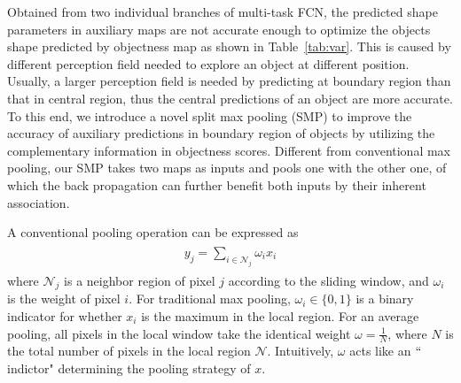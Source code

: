 Obtained from two individual branches of multi-task FCN, the predicted shape parameters in auxiliary maps are not accurate enough to optimize the objects shape predicted by objectness map as shown in Table~\ref{tab:var}.
This is caused by different perception field needed to explore an object at different position.
Usually, a larger perception field is needed by predicting at boundary region than that in central region, thus the central predictions of an object are more accurate.
To this end, we introduce a novel split max pooling (SMP) to improve the accuracy of auxiliary predictions in boundary region of objects by utilizing the complementary information in objectness scores.
Different from conventional max pooling, our SMP takes two maps as inputs and pools one with the other one, of which the back propagation can further benefit both inputs by their inherent association.

A conventional pooling operation can be expressed as
\begin{eqnarray}\label{pooling}
\begin{aligned}
y_{j} = \sum_{i\in \mathcal{N}_{j}} \omega_{i}x_{i}
\end{aligned}
\end{eqnarray}
where $\mathcal{N}_{j}$ is a neighbor region of pixel $j$ according to the sliding window, and $\omega_{i}$ is the weight of pixel $i$.
For traditional max pooling, $\omega_i \in \{0,1\}$ is a binary indicator for whether $x_i$ is the maximum in the local region.
For an average pooling, all pixels in the local window take the identical weight $\omega=\frac{1}{N}$, where $N$ is the total number of pixels in the local region $\mathcal{N}$.
Intuitively, $\omega$ acts like an $``$indictor" determining the pooling strategy of $x$.

